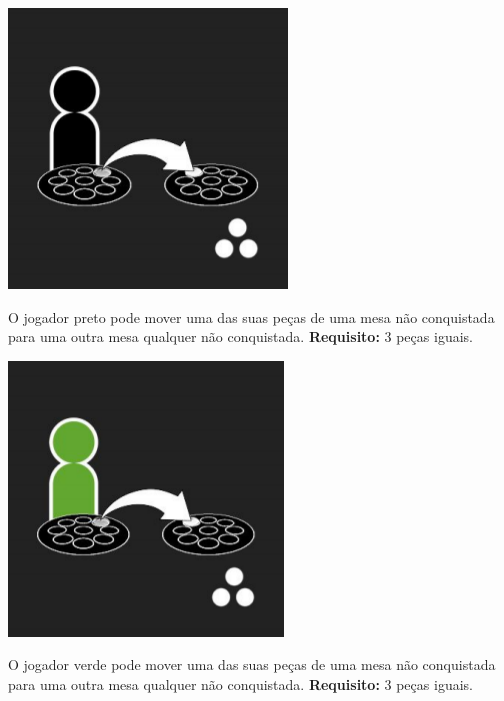 \documentclass[a4paper]{article}
\begin{document}
\begin{minipage}[t]{0.1\textwidth}
\includegraphics[scale=0.25]{black-move.png}
\end{minipage}
\begin{minipage}[t]{0.3\textwidth}
O jogador preto pode mover uma das suas peças de uma mesa não conquistada para uma outra mesa qualquer não conquistada. \textbf{Requisito:} 3 peças iguais.
\end{minipage}

\begin{minipage}[t]{0.1\textwidth}
\includegraphics[scale=0.25]{green-move.png}
\end{minipage}
\begin{minipage}[t]{0.3\textwidth}
O jogador verde pode mover uma das suas peças de uma mesa não conquistada para uma outra mesa qualquer não conquistada. \textbf{Requisito:} 3 peças iguais.
\end{minipage}
\end{document}
